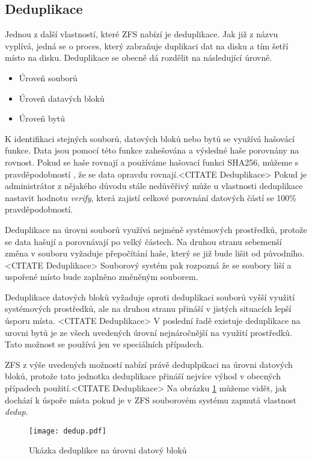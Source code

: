     \subsection{Deduplikace}
    \label{dedup}
    Jednou z další vlastností, které ZFS nabízí je deduplikace. Jak již z názvu vyplívá, jedná se o proces, který zabraňuje duplikaci dat na disku a tím šetří místo na disku. Deduplikace se obecně dá rozdělit na následující úrovně.
    \begin{itemize}
      \item Úroveň souborů
      \item Úroveň datavých bloků
      \item Úroveň bytů
    \end{itemize}

    K identifikaci stejných souborů, datových bloků nebo bytů se využívá hašovácí funkce. Data jsou pomocí této funkce zahešována a výsledné haše porovnány na rovnost. Pokud se haše rovnají a používáme hašovací funkci SHA256, můžeme s pravděpodobností , že se data opravdu rovnají.<CITATE Deduplikace> Pokud je administrátor z nějakého důvodu stále nedůvěřivý může u vlastnosti deduplikace nastavit hodnotu \emph{verify}, která zajistí celkové porovnání datových částí se 100\% pravděpodobností.

    Deduplikace na úrovni souborů využívá nejméně systémových prostředků, protože se data hašují a porovnávají po velký částech. Na druhou stranu sebemenší změna v souboru vyžaduje přepočítání haše, který se již bude lišit od původního.<CITATE Deduplikace> Souborový systém pak rozpozná že se soubory liší a uspořené místo bude zaplněno změněným souborem.

    Deduplikace datových bloků vyžaduje oproti deduplikaci souborů vyšší využití systémových prostředků, ale na druhou stranu přináší v jistých situacích lepší úsporu místa. <CITATE Deduplikace>
    V poslední řadě existuje deduplikace na urovni bytů je ze všech uvedených úrovní nejnáročnější na využití prostředků. Tato možnost se používá jen ve speciálních případech.

    ZFS z výše uvedených možností nabízí právě deduplpikaci na úrovni datových bloků, protože tato jednotka deduplikace přináší nejvíce výhod v obecných případech použití.<CITATE Deduplikace> Na obrázku \ref{blockdedup} můžeme vidět, jak dochází k úspoře místa pokud je v ZFS souborovém systému zapnutá vlastnost \emph{dedup}.
    \begin{figure}[!h]
        \caption{Ukázka deduplikce na úrovni datový bloků}
        \label{blockdedup}
        \texttt{[image: dedup.pdf]}
    \end{figure}
